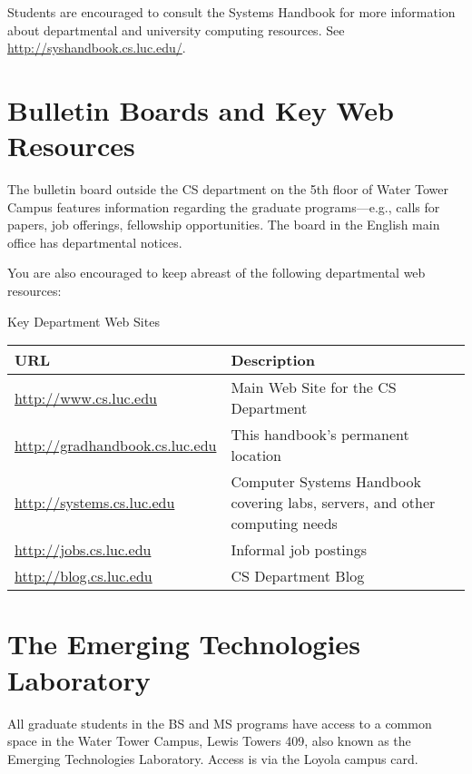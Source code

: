 \documentclass[letterpaper,10pt,english]{sphinxmanual}
\begin{document}
Students are encouraged to consult the Systems Handbook for more information about
departmental and university computing resources. See \href{http://syshandbook.cs.luc.edu/}{http://syshandbook.cs.luc.edu/}.


\section{Bulletin Boards and Key Web Resources}
\label{general:bulletin-boards-and-key-web-resources}
The bulletin board outside the CS department on the 5th floor of Water Tower Campus features information regarding the graduate programs—e.g., calls for papers, job offerings, fellowship opportunities. The board in the English main office has departmental notices.

You are also encouraged to keep abreast of the following departmental web resources:


\begin{threeparttable}
\capstart\caption{Key Department Web Sites}

\begin{tabulary}{\linewidth}{|L|L|}
\hline
\textbf{
URL
} & \textbf{
Description
}\\\hline

\href{http://www.cs.luc.edu}{http://www.cs.luc.edu}
 & 
Main Web Site for the CS Department
\\\hline

\href{http://gradhandbook.cs.luc.edu}{http://gradhandbook.cs.luc.edu}
 & 
This handbook's permanent location
\\\hline

\href{http://systems.cs.luc.edu}{http://systems.cs.luc.edu}
 & 
Computer Systems Handbook covering labs, servers, and other computing needs
\\\hline

\href{http://jobs.cs.luc.edu}{http://jobs.cs.luc.edu}
 & 
Informal job postings
\\\hline

\href{http://blog.cs.luc.edu}{http://blog.cs.luc.edu}
 & 
CS Department Blog
\\\hline
\end{tabulary}

\end{threeparttable}



\section{The Emerging Technologies Laboratory}
\label{general:the-emerging-technologies-laboratory}
All graduate students in the BS and MS programs have access to a common space in the Water Tower Campus, Lewis Towers 409, also known as the Emerging Technologies Laboratory. Access is via the Loyola campus card.
\end{document}
